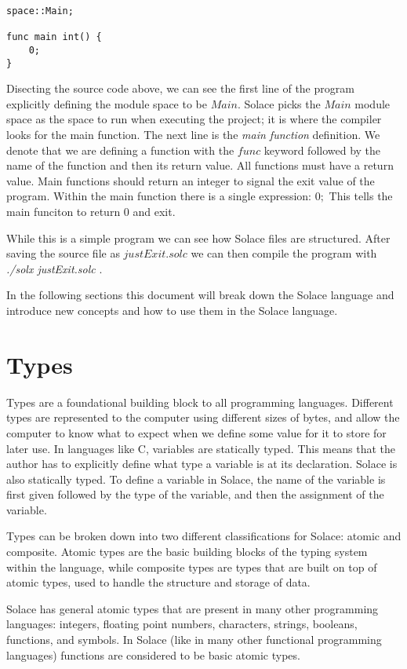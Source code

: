 \documentclass{article}
\begin{document}
\begin{lstlisting}
space::Main;

func main int() {
	0;
}
\end{lstlisting}

Disecting the source code above, we can see the first line of the program explicitly defining the module space to be $Main$. Solace
picks the $Main$ module space as the space to run when executing the project; it is where the compiler looks for the main function.
The next line is the \textit{main function} definition. We denote that we are defining a function with the $func$ keyword followed by
the name of the function and then its return value. All functions must have a return value. Main functions should return an integer
to signal the exit value of the program. Within the main function there is a single expression: $0;$ This tells the main funciton
to return $0$ and exit.

While this is a simple program we can see how Solace files are structured. After saving the source file as $justExit.solc$ we can
then compile the program with \textit{./solx justExit.solc} .

In the following sections this document will break down the Solace language and introduce new concepts and how to use them in the
Solace language.


\section{Types}

Types are a foundational building block to all programming languages. Different types are represented to the computer using
different sizes of bytes, and allow the computer to know what to expect when we define some value for it to store for later
use. In languages like C, variables are statically typed. This means that the author has to explicitly define what type a
variable is at its declaration. Solace is also statically typed. To define a variable in Solace, the name of the variable is
first given followed by the type of the variable, and then the assignment of the variable.

Types can be broken down into two different classifications for Solace: atomic and composite. Atomic types are the basic
building blocks of the typing system within the language, while composite types are types that are built on top of atomic
types, used to handle the structure and storage of data.

Solace has general atomic types that are present in many other programming languages: integers, floating point numbers, characters,
strings, booleans, functions, and symbols. In Solace (like in many other functional programming languages) functions are considered
to be basic atomic types.
\end{document}
